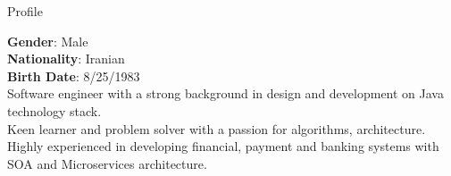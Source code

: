 
\begin{jrsection}[location = sidebar]{Profile}
    \begin{jrdescription}
        {\bfseries Gender}: Male \\
        {\bfseries Nationality}: Iranian \\
        {\bfseries Birth Date}: 8/25/1983 \\
        Software engineer with a strong background in design and development on Java technology stack.\\
        Keen learner and problem solver with a passion for algorithms, architecture.\\
        Highly experienced in developing financial, payment and banking systems with SOA and Microservices architecture.
    \end{jrdescription}
\end{jrsection}
